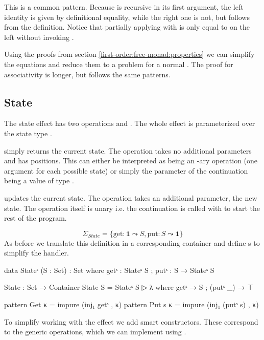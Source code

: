 This is a common pattern.
Because \AgdaFunction{++} is recursive in its first argument, the left
identity is given by definitional equality, while the right one is not, but
follows from the definition.
Notice that partially applying \AgdaFunction{++} with
\AgdaInductiveConstructor{[]} is only equal to  on the left
without invoking .

Using the proofs from section \ref{first-order:free-monad:properties} we
can simplify the equations and reduce them to a problem for a normal
.
The proof for associativity is longer, but follows the same patterns.


\subsection{State}

The state effect has two operations  and .
The whole effect is parameterized over the state type .

 simply returns the current state.
The operation takes no additional parameters and has  positions.
This can either be interpreted as  being an
-ary operation (one argument for each possible state) or
simply the parameter of the continuation being a value of type .

 updates the current state.
The operation takes an additional parameter, the new state.
The operation itself is unary i.e. the continuation is called with
 to start the rest of the program.

$$
\Sigma_{State} = \{ \mathrm{get} : \mathbf{1} \leadsto S, \mathrm{put} :
S \leadsto \mathbf{1} \}
$$
As before we translate this definition in a corresponding container and
define s to simplify the handler.

\begin{code}
data Stateˢ (S : Set) : Set where getˢ : Stateˢ S ; putˢ : S → Stateˢ S

State : Set → Container
State S = Stateˢ S ▷ λ where getˢ → S ; (putˢ _) → ⊤

pattern Get κ    = impure (inj₁ getˢ      , κ)
pattern Put s κ  = impure (inj₁ (putˢ s)  , κ)
\end{code}
To simplify working with the  effect we add smart
constructors.
These correspond to the generic operations, which we can implement using
.

